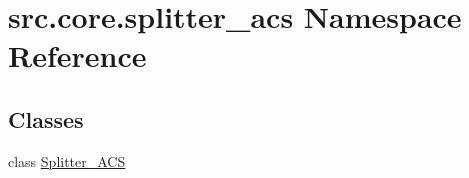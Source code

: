 \hypertarget{namespacesrc_1_1core_1_1splitter__acs}{}\section{src.\+core.\+splitter\+\_\+acs Namespace Reference}
\label{namespacesrc_1_1core_1_1splitter__acs}
\subsection*{Classes}
\begin{DoxyCompactItemize}
\item 
class \hyperlink{classsrc_1_1core_1_1splitter__acs_1_1Splitter__ACS}{Splitter\+\_\+\+A\+C\+S}
\end{DoxyCompactItemize}
